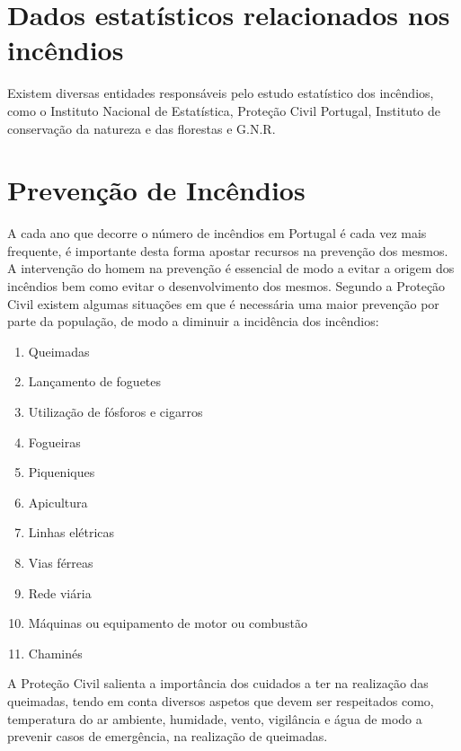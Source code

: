 \documentclass[a4paper,11pt]{report}
\begin{document}

\part{Dados estatísticos relacionados nos incêndios}
Existem diversas entidades responsáveis pelo estudo estatístico dos incêndios, como o Instituto Nacional de Estatística, Proteção Civil Portugal, Instituto de conservação da natureza e das florestas e G.N.R.


\part{Prevenção de Incêndios}
A cada ano que decorre o número de incêndios em Portugal é cada vez mais frequente, é importante desta forma apostar recursos na prevenção dos mesmos. A intervenção do homem na prevenção é essencial de modo a evitar a origem dos incêndios bem como evitar o desenvolvimento dos mesmos. Segundo a Proteção Civil existem algumas situações em que é necessária uma maior prevenção por parte da população, de modo a diminuir a incidência dos incêndios:
\begin{enumerate}
 \item Queimadas
 \item Lançamento de foguetes
 \item Utilização de fósforos e cigarros
 \item Fogueiras
 \item Piqueniques
 \item Apicultura
 \item Linhas elétricas
 \item Vias férreas
 \item Rede viária
 \item Máquinas ou equipamento de motor ou combustão
 \item Chaminés
\end{enumerate}

A Proteção Civil salienta a importância dos cuidados a ter na realização das queimadas, tendo em conta diversos aspetos que devem ser respeitados como, temperatura do ar ambiente, humidade, vento, vigilância e água de modo a prevenir casos de emergência, na realização de queimadas.

\end{document}
